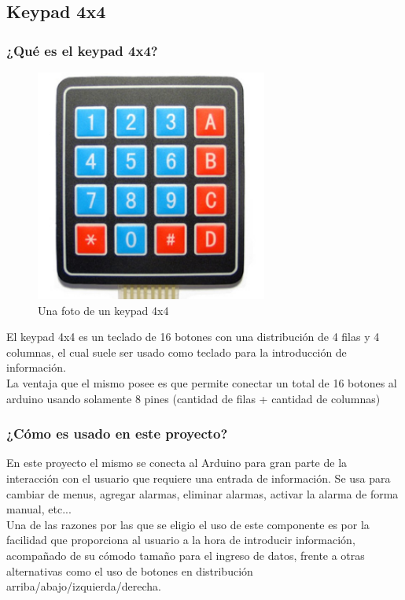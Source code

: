 \documentclass{article}
\begin{document}
	\subsection{Keypad 4x4}
		\subsubsection{¿Qué es el keypad 4x4?}
		\begin{figure}
			\centering
			\includegraphics[width= 3in, keepaspectratio]{keypad.jpg}
			\caption{Una foto de un keypad 4x4}	
		\end{figure}
		El keypad 4x4 es un teclado de 16 botones con una distribución de 4 filas y 4 
		columnas, el cual suele ser usado como teclado para la introducción de información.\\
		La ventaja que el mismo posee es que permite conectar un total de 16 botones al 
		arduino usando solamente 8 pines (cantidad de filas + cantidad de columnas)

		\subsubsection{¿Cómo es usado en este proyecto?}
		En este proyecto el mismo se conecta al Arduino para gran parte de la interacción con
		el usuario que requiere una entrada de información.
		Se usa para cambiar de menus, agregar alarmas, eliminar alarmas, activar la alarma
		de forma manual, etc... \\
		Una de las razones por las que se eligio el uso de este componente es por la 
		facilidad que proporciona al usuario a la hora de introducir información, acompañado
		de su cómodo tamaño para el ingreso de datos, frente a otras alternativas como el
		uso de botones en distribución arriba/abajo/izquierda/derecha.
\end{document}
